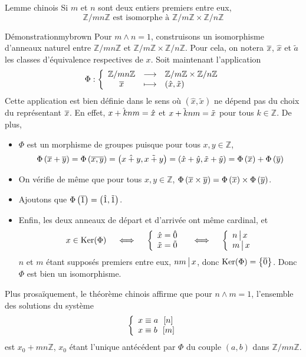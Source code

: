     \begin{lem}{Lemme chinois}{}
        Si $m$ et $n$ sont deux entiers premiers entre eux, 
        \[ \mathbb{Z} / mn \mathbb{Z} \text{ est isomorphe à } \mathbb{Z} / m \mathbb{Z} \times \mathbb{Z} / n \mathbb{Z} \]
    \end{lem}

    \begin{demo}{Démonstration}{mybrown}
        Pour $m \wedge n = 1$, construisons un isomorphisme d’anneaux naturel entre $\mathbb{Z}/ mn \mathbb{Z}$ et $\mathbb{Z} / m \mathbb{Z} \times \mathbb{Z} / n \mathbb{Z}$. Pour cela, on notera $\overline{x}$, $\hat{x}$ et $\tilde{a}$ les classes d’équivalence respectives de $x$. Soit maintenant l’application 
        \[ \fonction{\Phi}{\mathbb{Z}/ mn \mathbb{Z}}{\mathbb{Z} / m \mathbb{Z} \times \mathbb{Z} / n \mathbb{Z}}{\barr{x}}{(\hat{x}, \tilde{x})}  \]   
        Cette application est bien définie dans le sens où $(\hat{x}, \tilde{x})$ ne dépend pas du choix du représentant $\overline{x}$. En effet, $\Hat{x + knm} = \hat{x}$ et $\Tilde{x + knm} = \tilde{x}$ pour tous $k \in \mathbb{Z}$. De plus, 
        \begin{itemize}
            \item $\Phi$ est un morphisme de groupes puisque pour tous $x,y \in \mathbb{Z}$,
            \[ \Phi\left(\overline{x} + \overline{y}\right) = \Phi\left(\overline{x,y}\right) = \left(\Hat{x + y}, \Tilde{x+ y}\right) = \left(\hat{x} + \hat{y}, \tilde{x} + \tilde{y}\right) = \Phi\left(\overline{x}\right) + \Phi\left(\overline{y}\right) \]   
            \item On vérifie de même que pour tous $x,y \in \mathbb{Z}$, $\Phi\left(\overline{x} \times \overline{y}\right) = \Phi\left(\overline{x}\right) \times \Phi\left(\overline{y}\right)$.
            \item Ajoutons que $\Phi\left(\overline{1}\right) = \left(\hat{1}, \tilde{1}\right)$.
            \item Enfin, les deux anneaux de départ et d’arrivée ont même cardinal, et 
            \[ x \in \Ker(\Phi) \quad \iff \quad \et{\hat{x} = \hat{0}}{\tilde{x} = \tilde{0}} \quad \iff \quad \et{n \tq x}{m \tq x} \]   
            $n$ et $m$ étant supposés premiers entre eux, $nm \, \big| \, x$, donc $\operatorname{Ker}(\Phi) = \left\{\overline{0}\right\}$. Donc $\Phi$ est bien un isomorphisme.
        \end{itemize}
    \end{demo}

    Plus prosaïquement, le théorème chinois affirme que pour $n \wedge m = 1$, l’ensemble des solutions du système 
    \[ \et{\eqmodulo{x}{a}{n}}{\eqmodulo{x}{b}{m}} \]   
    est $x_0 + mn \mathbb{Z}$, $x_0$ étant l’unique antécédent par $\Phi$ du couple $(a,b)$ dans $\mathbb{Z} / m n \mathbb{Z}$. 

